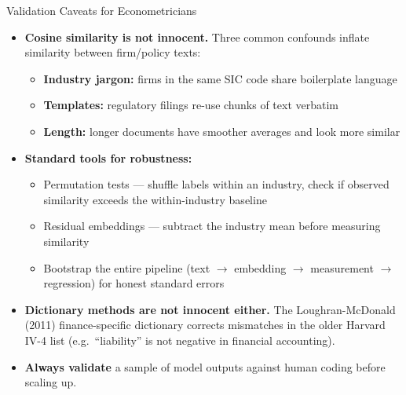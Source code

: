 \begin{frame}{Validation Caveats for Econometricians}
\begin{itemize}
\item \textbf{Cosine similarity is not innocent.} Three common confounds inflate similarity between firm/policy texts:
\begin{itemize}
    \item \textbf{Industry jargon:} firms in the same SIC code share boilerplate language
    \item \textbf{Templates:} regulatory filings re-use chunks of text verbatim
    \item \textbf{Length:} longer documents have smoother averages and look more similar
\end{itemize}

\medskip
\item \textbf{Standard tools for robustness:}
\begin{itemize}
    \item Permutation tests --- shuffle labels within an industry, check if observed similarity exceeds the within-industry baseline
    \item Residual embeddings --- subtract the industry mean before measuring similarity
    \item Bootstrap the entire pipeline (text $\rightarrow$ embedding $\rightarrow$ measurement $\rightarrow$ regression) for honest standard errors
\end{itemize}

\medskip
\item \textbf{Dictionary methods are not innocent either.} The Loughran-McDonald (2011) finance-specific dictionary corrects mismatches in the older Harvard IV-4 list (e.g.\ ``liability'' is not negative in financial accounting).

\medskip
\item \textbf{Always validate} a sample of model outputs against human coding before scaling up.
\end{itemize}
\end{frame}

